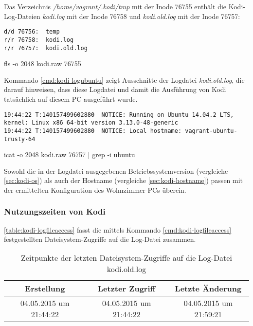 Das Verzeichnis \textit{/home/vagrant/.kodi/tmp} mit der Inode 76755 enthält die Kodi-Log-Dateien \textit{kodi.log} mit der Inode 76758 und \textit{kodi.old.log} mit der Inode 76757:

\begin{cmd}[H]
\begin{verbatim}
d/d 76756:	temp
r/r 76758:	kodi.log
r/r 76757:	kodi.old.log
\end{verbatim}
\caption{fls -o 2048 kodi.raw 76755}
\label{cmd:kodi-logs}
\end{cmd}

Kommando \autoref{cmd:kodi-logubuntu} zeigt Ausschnitte der Logdatei \textit{kodi.old.log}, die darauf hinweisen, dass diese Logdatei und damit die Ausführung von Kodi tatsächlich auf diesem PC ausgeführt wurde.

\begin{cmd}[H]
\begin{Verbatim}[fontsize=\tiny]
19:44:22 T:140157499602880  NOTICE: Running on Ubuntu 14.04.2 LTS, kernel: Linux x86 64-bit version 3.13.0-48-generic
19:44:22 T:140157499602880  NOTICE: Local hostname: vagrant-ubuntu-trusty-64
\end{Verbatim}
\caption{icat -o 2048 kodi.raw 76757 | grep -i ubuntu}
\label{cmd:kodi-logubuntu}
\end{cmd}

Sowohl die in der Logdatei ausgegebenen Betriebssystemversion (vergleiche \autoref{sec:kodi-os}) als auch der Hostname (vergleiche \autoref{sec:kodi-hostname}) passen mit der ermittelten Konfiguration des Wohnzimmer-PCs überein.

\subsubsection{Nutzungszeiten von Kodi}

\autoref{table:kodi-logfileaccess} fasst die mittels Kommando \autoref{cmd:kodi-logfileaccess} festgestellten Dateisystem-Zugriffe auf die Log-Datei zusammen.

\begin{table}[H]
\begin{tabular}{ccc}
\hline 
Erstellung & Letzter Zugriff & Letzte Änderung \\ 
\hline 
04.05.2015 um 21:44:22 & 04.05.2015 um 21:44:22 & 04.05.2015 um 21:59:21 \\ 
\hline 
\end{tabular}
\caption{Zeitpunkte der letzten Dateisystem-Zugriffe auf die Log-Datei kodi.old.log}
\label{table:kodi-logfileaccess}
\end{table}


